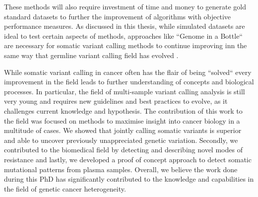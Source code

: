 These methods will also require investment of time and money to generate gold standard datasets to further the improvement of algorithms with objective performance measures. As discussed in this thesis, while simulated datasets are ideal to test certain aspects of methods, approaches like ``Genome in a Bottle`` are necessary for somatic variant calling methods to continue improving inn the same way that germline variant calling field has evolved \cite{ValleInclan2022}.

While somatic variant calling in cancer often has the flair of being ``solved`` every improvement in the field leads to further understanding of concepts and biological processes. In particular, the field of multi-sample variant calling analysis is still very young and requires new guidelines and best practices to evolve, as it challenges current knowledge and hypothesis. The contribution of this work to the field was focused on methods to maximise insight into cancer biology in a multitude of cases. We showed that jointly calling somatic variants is superior and able to uncover previously unappreciated genetic variation. Secondly, we contributed to the biomedical field by detecting and describing novel modes of resistance and lastly, we developed a proof of concept approach to detect somatic mutational patterns from plasma samples. Overall, we believe the work done during this PhD has significantly contributed to the knowledge and capabilities in the field of genetic cancer heterogeneity.


